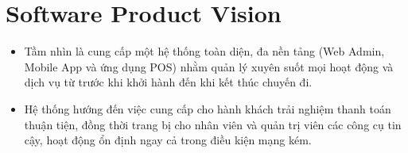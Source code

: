 \section{Software Product Vision}
\begin{itemize}
    \item Tầm nhìn là cung cấp một hệ thống toàn diện, đa nền tảng (Web Admin, Mobile App và ứng dụng POS) nhằm quản lý xuyên suốt mọi hoạt động và dịch vụ từ trước khi khởi hành đến khi kết thúc chuyến đi.
    \item Hệ thống hướng đến việc cung cấp cho hành khách trải nghiệm thanh toán thuận tiện, đồng thời trang bị cho nhân viên và quản trị viên các công cụ tin cậy, hoạt động ổn định ngay cả trong điều kiện mạng kém.
\end{itemize}